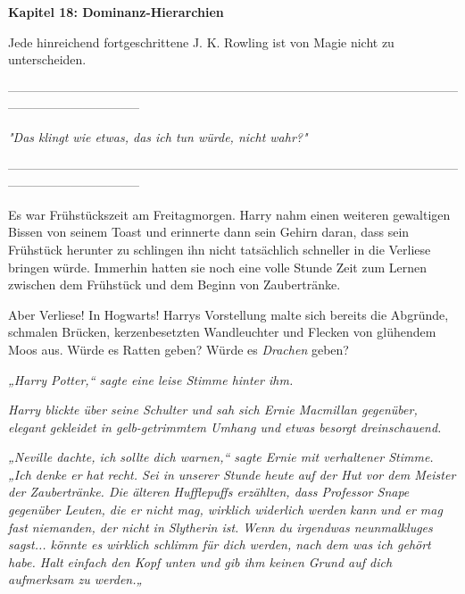 

\hypertarget{dominanz-hierarchien}{%

\textbf{Kapitel 18: Dominanz-Hierarchien\\ }

\hfill\break Jede hinreichend fortgeschrittene J. K. Rowling ist von Magie nicht zu unterscheiden.

--------------------------------------------------------------------------------------------------------------------------------------------

\hfill\break

\emph{"Das klingt wie etwas, das ich tun würde, nicht wahr?"}

\hfill\break

--------------------------------------------------------------------------------------------------------------------------------------------

\hfill\break Es war Frühstückszeit am Freitagmorgen. Harry nahm einen weiteren gewaltigen Bissen von seinem Toast und erinnerte dann sein Gehirn daran, dass sein Frühstück herunter zu schlingen ihn nicht tatsächlich schneller in die Verliese bringen würde. Immerhin hatten sie noch eine volle Stunde Zeit zum Lernen zwischen dem Frühstück und dem Beginn von Zaubertränke.

Aber Verliese! In Hogwarts! Harrys Vorstellung malte sich bereits die Abgründe, schmalen Brücken, kerzenbesetzten Wandleuchter und Flecken von glühendem Moos aus. Würde es Ratten geben? Würde es \emph{Drachen} geben?

\emph{„Harry Potter,“ sagte eine leise Stimme hinter ihm.}

\emph{Harry blickte über seine Schulter und sah sich Ernie Macmillan gegenüber, elegant gekleidet in gelb-getrimmtem Umhang und etwas besorgt dreinschauend.}

\emph{„Neville dachte, ich sollte dich warnen,“ sagte Ernie mit verhaltener Stimme. „Ich denke er hat recht. Sei in unserer Stunde heute auf der Hut vor dem Meister der Zaubertränke. Die älteren Hufflepuffs erzählten, dass Professor Snape gegenüber Leuten, die er nicht mag, wirklich widerlich werden} \emph{kann} \emph{und er mag fast niemanden, der nicht in Slytherin ist. Wenn du irgendwas neunmalkluges sagst... könnte es wirklich schlimm für dich werden, nach dem was ich gehört habe. Halt einfach den Kopf unten und gib ihm keinen Grund auf dich aufmerksam zu werden.„}

}
